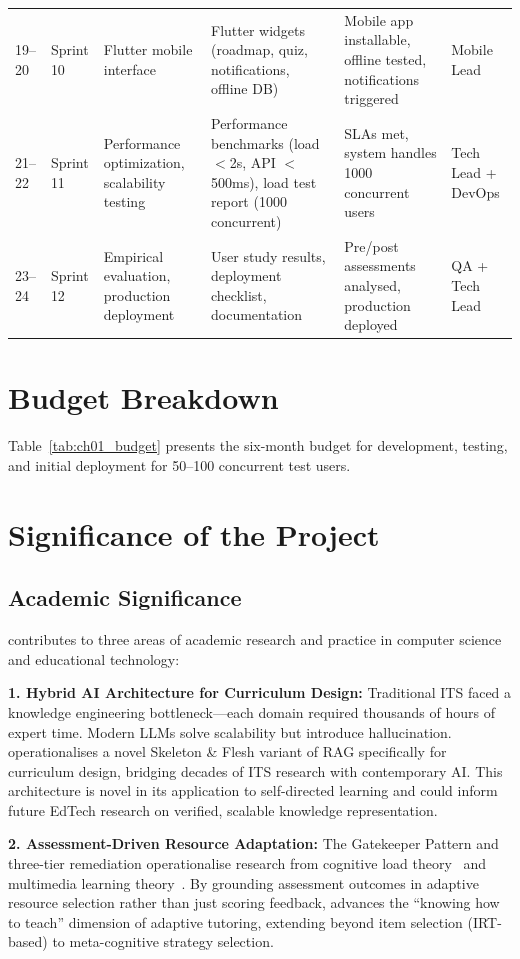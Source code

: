 \begin{longtable}{llllll}
    19--20 & Sprint 10 & Flutter mobile interface & Flutter widgets (roadmap, quiz, notifications, offline DB) & Mobile app installable, offline tested, notifications triggered & Mobile Lead \\
    21--22 & Sprint 11 & Performance optimization, scalability testing & Performance benchmarks (load $<$2s, API $<$500ms), load test report (1000 concurrent) & SLAs met, system handles 1000 concurrent users & Tech Lead + DevOps \\
    23--24 & Sprint 12 & Empirical evaluation, production deployment & User study results, deployment checklist, documentation & Pre/post assessments analysed, production deployed & QA + Tech Lead \\
\end{longtable}

\section{Budget Breakdown}
\label{sec:budget}

Table~\ref{tab:ch01_budget} presents the six-month budget for development, testing, and initial deployment for 50--100 concurrent test users.




\section{Significance of the Project}
\label{sec:significance}

\subsection{Academic Significance}

\projectname{} contributes to three areas of academic research and practice in computer science and educational technology:

\textbf{1. Hybrid AI Architecture for Curriculum Design:} Traditional ITS faced a knowledge engineering bottleneck---each domain required thousands of hours of expert time. Modern LLMs solve scalability but introduce hallucination. \projectname{} operationalises a novel Skeleton \& Flesh variant of RAG specifically for curriculum design, bridging decades of ITS research with contemporary AI. This architecture is novel in its application to self-directed learning and could inform future EdTech research on verified, scalable knowledge representation.

\textbf{2. Assessment-Driven Resource Adaptation:} The Gatekeeper Pattern and three-tier remediation operationalise research from cognitive load theory~\cite{sweller1988} and multimedia learning theory~\cite{clark2016, mayer2009}. By grounding assessment outcomes in adaptive resource selection rather than just scoring feedback, \projectname{} advances the \enquote{knowing how to teach} dimension of adaptive tutoring, extending beyond item selection (IRT-based) to meta-cognitive strategy selection.

